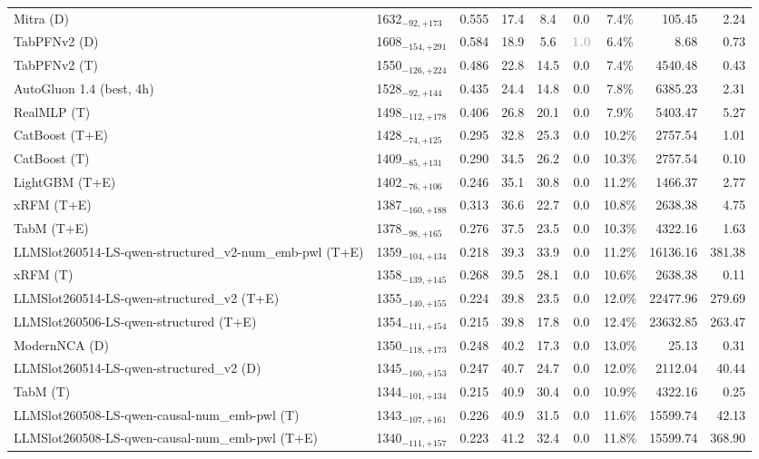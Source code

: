\begin{tabular}{llcccccrr}
Mitra (D) & 1632${}_{-92,+173}$ & 0.555 & 17.4 & 8.4 & 0.0 & 7.4\% & 105.45 & 2.24 \\
TabPFNv2 (D) & 1608${}_{-154,+291}$ & 0.584 & 18.9 & 5.6 & \textcolor{silver}{\textbf{1.0}} & 6.4\% & 8.68 & 0.73 \\
TabPFNv2 (T) & 1550${}_{-126,+224}$ & 0.486 & 22.8 & 14.5 & 0.0 & 7.4\% & 4540.48 & 0.43 \\
AutoGluon 1.4 (best, 4h) & 1528${}_{-92,+144}$ & 0.435 & 24.4 & 14.8 & 0.0 & 7.8\% & 6385.23 & 2.31 \\
RealMLP (T) & 1498${}_{-112,+178}$ & 0.406 & 26.8 & 20.1 & 0.0 & 7.9\% & 5403.47 & 5.27 \\
CatBoost (T+E) & 1428${}_{-74,+125}$ & 0.295 & 32.8 & 25.3 & 0.0 & 10.2\% & 2757.54 & 1.01 \\
CatBoost (T) & 1409${}_{-85,+131}$ & 0.290 & 34.5 & 26.2 & 0.0 & 10.3\% & 2757.54 & 0.10 \\
LightGBM (T+E) & 1402${}_{-76,+106}$ & 0.246 & 35.1 & 30.8 & 0.0 & 11.2\% & 1466.37 & 2.77 \\
xRFM (T+E) & 1387${}_{-160,+188}$ & 0.313 & 36.6 & 22.7 & 0.0 & 10.8\% & 2638.38 & 4.75 \\
TabM (T+E) & 1378${}_{-98,+165}$ & 0.276 & 37.5 & 23.5 & 0.0 & 10.3\% & 4322.16 & 1.63 \\
LLMSlot260514-LS-qwen-structured_v2-num_emb-pwl (T+E) & 1359${}_{-104,+134}$ & 0.218 & 39.3 & 33.9 & 0.0 & 11.2\% & 16136.16 & 381.38 \\
xRFM (T) & 1358${}_{-139,+145}$ & 0.268 & 39.5 & 28.1 & 0.0 & 10.6\% & 2638.38 & 0.11 \\
LLMSlot260514-LS-qwen-structured_v2 (T+E) & 1355${}_{-140,+155}$ & 0.224 & 39.8 & 23.5 & 0.0 & 12.0\% & 22477.96 & 279.69 \\
LLMSlot260506-LS-qwen-structured (T+E) & 1354${}_{-111,+154}$ & 0.215 & 39.8 & 17.8 & 0.0 & 12.4\% & 23632.85 & 263.47 \\
ModernNCA (D) & 1350${}_{-118,+173}$ & 0.248 & 40.2 & 17.3 & 0.0 & 13.0\% & 25.13 & 0.31 \\
LLMSlot260514-LS-qwen-structured_v2 (D) & 1345${}_{-160,+153}$ & 0.247 & 40.7 & 24.7 & 0.0 & 12.0\% & 2112.04 & 40.44 \\
TabM (T) & 1344${}_{-101,+134}$ & 0.215 & 40.9 & 30.4 & 0.0 & 10.9\% & 4322.16 & 0.25 \\
LLMSlot260508-LS-qwen-causal-num_emb-pwl (T) & 1343${}_{-107,+161}$ & 0.226 & 40.9 & 31.5 & 0.0 & 11.6\% & 15599.74 & 42.13 \\
LLMSlot260508-LS-qwen-causal-num_emb-pwl (T+E) & 1340${}_{-111,+157}$ & 0.223 & 41.2 & 32.4 & 0.0 & 11.8\% & 15599.74 & 368.90 \\

\end{tabular}
